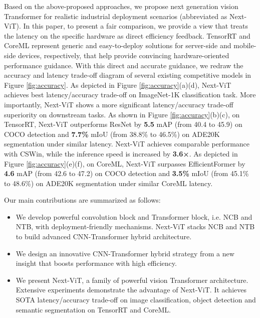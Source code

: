 \documentclass[10pt,twocolumn,letterpaper]{article}
\begin{document}
Based on the above-proposed approaches, we propose next generation vision Transformer for realistic industrial deployment scenarios (abbreviated as Next-ViT). In this paper, to present a fair comparison, we provide a view that treats the latency on the specific hardware as direct efficiency feedback. TensorRT and CoreML represent generic and easy-to-deploy solutions for server-side and mobile-side devices, respectively, that help provide convincing hardware-oriented performance guidance. With this direct and accurate guidance, we redraw the accuracy and latency trade-off diagram of several existing competitive models in Figure \ref{fig:accuracy}. As depicted in Figure \ref{fig:accuracy}(a)(d), Next-ViT achieves best latency/accuracy trade-off on ImageNet-1K classification task. More importantly, Next-ViT shows a more significant latency/accuracy trade-off superiority on downstream tasks. As shown in Figure \ref{fig:accuracy}(b)(c), on TensorRT, Next-ViT outperforms ResNet by \textbf{5.5} mAP (from 40.4 to 45.9) on COCO detection and \textbf{7.7\%} mIoU (from 38.8\% to 46.5\%) on ADE20K segmentation under similar latency. Next-ViT achieves comparable performance with CSWin, while the inference speed is increased by \textbf{3.6×}. As depicted in Figure \ref{fig:accuracy}(e)(f), on CoreML, Next-ViT surpasses EfficientFormer by \textbf{4.6} mAP (from 42.6 to 47.2) on COCO detection and \textbf{3.5\%} mIoU (from 45.1\% to 48.6\%) on ADE20K segmentation under similar CoreML latency.

Our main contributions are summarized as follows:
\begin{itemize}
    \item We develop powerful convolution block and Transformer block, i.e. NCB and NTB, with deployment-friendly mechanisms. Next-ViT stacks NCB and NTB to build advanced CNN-Transformer hybrid architecture. 
    \item We design an innovative CNN-Transformer hybrid strategy from a new insight that boosts performance with high efficiency.
    \item We present Next-ViT, a family of powerful vision Transformer architecture. Extensive experiments demonstrate the advantage of Next-ViT. It achieves SOTA latency/accuracy trade-off on image classification, object detection and semantic segmentation on TensorRT and CoreML.
\end{itemize}
	
\end{document}
